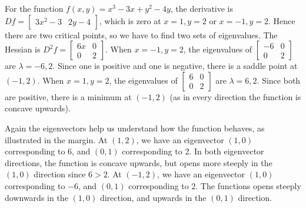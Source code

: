 \begin{example}
For the function {$f(x,y)=x^3-3x+y^2-4y$}, the derivative is $Df = \begin{bmatrix}3x^2-3&2y-4 \end{bmatrix}$, which is zero at $x=1,y=2$ or $x=-1,y=2$. Hence there are two critical points, so we have to find two sets of eigenvalues. The Hessian is $D^2f = \begin{bmatrix}6x&0 \\0&2\end{bmatrix}$. When $x=-1,y=2$, the eigenvalues of $\begin{bmatrix}-6&0 \\0&2\end{bmatrix}$ are $\lambda=-6,2$. Since one is positive and one is negative, there is a saddle point at $(-1,2)$. When $x=1,y=2$, the eigenvalues of $\begin{bmatrix}6&0 \\0&2\end{bmatrix}$ are $\lambda=6,2$. Since both are positive, there is a minimum at $(-1,2)$ (as in every direction the function is concave upwards).

Again the eigenvectors help us understand how the function behaves, as illustrated in the margin.  At $(1,2)$, we have an eigenvector $(1,0)$ corresponding to 6, and $(0,1)$ corresponding to 2. In both eigenvector directions, the function is concave upwards, but opens more steeply in the $(1,0)$ direction since \mbox{$6>2$}.  At $(-1,2)$, we have an eigenvector $(1,0)$ corresponding to $-6$, and $(0,1)$ corresponding to 2. The functions opens steeply downwards in the $(1,0)$ direction, and upwards in the $(0,1)$ direction.
\end{example}















